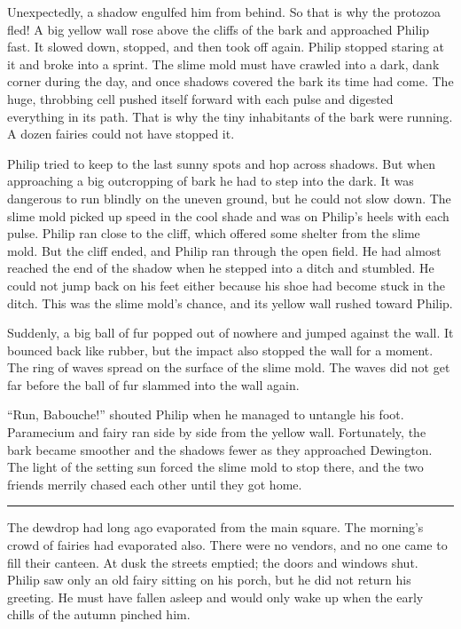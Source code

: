 \documentclass[10pt, draft]{memoir}
\renewcommand{\pfbreakdisplay}{\bigskip \ding{166} \bigskip}
\newcommand{\secbreak}{\fancybreak{\pfbreakdisplay}}
\begin{document}
Unexpectedly, a shadow engulfed him from behind. So that is why the protozoa fled! A big yellow wall rose above the cliffs of the bark and approached Philip fast. It slowed down, stopped, and then took off again. Philip stopped staring at it and broke into a sprint. The slime mold must have crawled into a dark, dank corner during the day, and once shadows covered the bark its time had come. The huge, throbbing cell pushed itself forward with each pulse and digested everything in its path. That is why the tiny inhabitants of the bark were running. A dozen fairies could not have stopped it.

Philip tried to keep to the last sunny spots and hop across shadows. But when approaching a big outcropping of bark he had to step into the dark. It was dangerous to run blindly on the uneven ground, but he could not slow down. The slime mold picked up speed in the cool shade and was on Philip's heels with each pulse. Philip ran close to the cliff, which offered some shelter from the slime mold. But the cliff ended, and Philip ran through the open field. He had almost reached the end of the shadow when he stepped into a ditch and stumbled. He could not jump back on his feet either because his shoe had become stuck in the ditch. This was the slime mold's chance, and its yellow wall rushed toward Philip.

Suddenly, a big ball of fur popped out of nowhere and jumped against the wall. It bounced back like rubber, but the impact also stopped the wall for a moment. The ring of waves spread on the surface of the slime mold. The waves did not get far before the ball of fur slammed into the wall again.

``Run, Babouche!'' shouted Philip when he managed to untangle his foot. Paramecium and fairy ran side by side from the yellow wall. Fortunately, the bark became smoother and the shadows fewer as they approached Dewington. The light of the setting sun forced the slime mold to stop there, and the two friends merrily chased each other until they got home.

\secbreak

The dewdrop had long ago evaporated from the main square. The morning's crowd of fairies had evaporated also. There were no vendors, and no one came to fill their canteen. At dusk the streets emptied; the doors and windows shut. Philip saw only an old fairy sitting on his porch, but he did not return his greeting. He must have fallen asleep and would only wake up when the early chills of the autumn pinched him.
\end{document}
